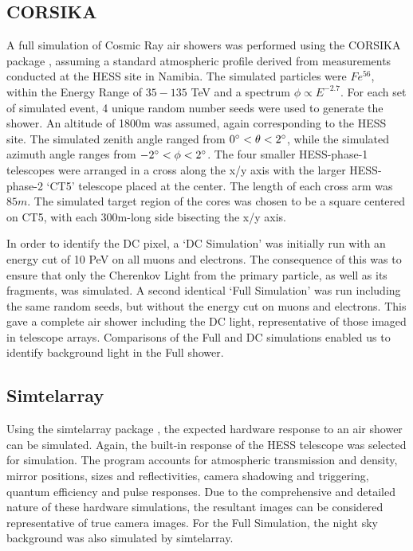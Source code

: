 \documentclass{article}
\begin{document}
\subsection{CORSIKA}
A full simulation of Cosmic Ray air showers was performed using the CORSIKA package \cite{Heck98}, assuming a standard atmospheric profile derived from measurements conducted at the HESS site in Namibia. The simulated particles were $Fe^{56}$, within the Energy Range of $35-135$ TeV and a spectrum $\phi \propto E^{-2.7}$. For each set of simulated event, 4 unique random number seeds were used to generate the shower. An altitude of 1800m was assumed, again corresponding to the HESS site. The simulated zenith angle ranged from $0\degree < \theta < 2 \degree$, while the simulated azimuth angle ranges from $-2\degree < \phi < 2 \degree$. The four smaller HESS-phase-1 telescopes were arranged in a cross along the x/y axis with the larger HESS-phase-2 \textquoteleft CT5' telescope placed at the center. The length of each cross arm was $85m$. The simulated target region of the cores was chosen to be a square centered on CT5, with each 300m-long side bisecting the x/y axis.

In order to identify the DC pixel, a \textquoteleft DC Simulation' was initially run with an energy cut of 10 PeV on all muons and electrons. The consequence of this was to ensure that only the Cherenkov Light from the primary particle, as well as its fragments, was simulated. A second identical \textquoteleft Full Simulation' was run including the same random seeds, but without the energy cut on muons and electrons. This gave a complete air shower including the DC light, representative of those imaged in telescope arrays. Comparisons of the Full and DC simulations enabled us to identify background light in the Full shower.

\subsection{Sim\textunderscore telarray}
Using the sim\textunderscore telarray package \cite{Bernlohr08}, the expected hardware response to an air shower can be simulated. Again, the built-in response of the HESS telescope was selected for simulation. The program accounts for atmospheric transmission and density, mirror positions, sizes and reflectivities, camera shadowing and triggering, quantum efficiency and pulse responses. Due to the comprehensive and detailed nature of these hardware simulations, the resultant images can be considered representative of true camera images. For the Full Simulation, the night sky background was also simulated by sim\textunderscore telarray.
\end{document}
